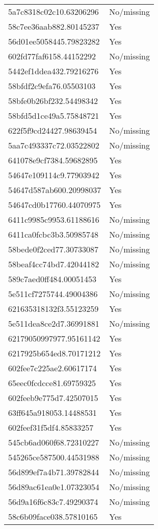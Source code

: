 \begin{tabular}{ll}
5a7c8318c02c10.63206296 & No/missing \\
58c7ee36aab882.80145237 & Yes \\
56d01ee5058445.79823282 & Yes \\
602fd77faf6158.44152292 & No/missing \\
5442ef1ddea432.79216276 & Yes \\
58bfdf2c9efa76.05503103 & Yes \\
58bfe0b26bf232.54498342 & Yes \\
58bfd5d1ce49a5.75848721 & Yes \\
622f5f9cd24427.98639454 & No/missing \\
5aa7c493337c72.03522802 & No/missing \\
641078e9cf7384.59682895 & Yes \\
54647e109114c9.77903942 & Yes \\
54647d587ab600.20998037 & Yes \\
54647cd0b17760.44070975 & Yes \\
6411c9985c9953.61188616 & No/missing \\
6411ca0fcbc3b3.50985748 & No/missing \\
58bede0f2ced77.30733087 & No/missing \\
58beaf4cc74bd7.42044182 & No/missing \\
589c7aed0ff484.00051453 & Yes \\
5e511cf7275744.49004386 & No/missing \\
621635318132f3.55123259 & Yes \\
5e511dea8ce2d7.36991881 & No/missing \\
62179050997977.95161142 & Yes \\
6217925b654ed8.70171212 & Yes \\
602fee7c225ae2.60617174 & Yes \\
65eec0fcdcce81.69759325 & Yes \\
602feeb9e775d7.42507015 & Yes \\
63ff645a918053.14488531 & Yes \\
602feef31f5df4.85833257 & Yes \\
545cb6ad060f68.72310227 & No/missing \\
545265ce587500.44531988 & No/missing \\
56d899ef7a4b71.39782844 & No/missing \\
56d89ac61ea0e1.07323054 & No/missing \\
56d9a16f6c83c7.49290374 & No/missing \\
58c6b09face038.57810165 & Yes \\

\end{tabular}
